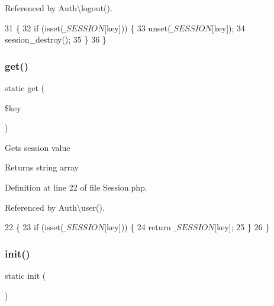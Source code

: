 Referenced by Auth\textbackslash{}logout().


\begin{DoxyCode}
31                                          \{
32         \textcolor{keywordflow}{if} (isset($\_SESSION[$key])) \{
33             unset($\_SESSION[$key]);
34             session\_destroy();
35         \}
36     \}
\end{DoxyCode}
\hypertarget{class_session_a15e2679f2a8f6fa4d60757f4d65413ac}{}\label{class_session_a15e2679f2a8f6fa4d60757f4d65413ac} 
\subsubsection{\texorpdfstring{get()}{get()}}
{\footnotesize\ttfamily static get (\begin{DoxyParamCaption}\item[{}]{\$key }\end{DoxyParamCaption})\hspace{0.3cm}{\ttfamily [static]}}

Gets session value

\begin{DoxyReturn}{Returns}
string array 
\end{DoxyReturn}


Definition at line 22 of file Session.\+php.



Referenced by Auth\textbackslash{}user().


\begin{DoxyCode}
22                                      \{
23         \textcolor{keywordflow}{if} (isset($\_SESSION[$key])) \{
24             \textcolor{keywordflow}{return} $\_SESSION[$key];
25         \}
26     \}
\end{DoxyCode}
\hypertarget{class_session_a9f0be6ae273d3669e11c29910a0be338}{}\label{class_session_a9f0be6ae273d3669e11c29910a0be338} 
\subsubsection{\texorpdfstring{init()}{init()}}
{\footnotesize\ttfamily static init (\begin{DoxyParamCaption}{ }\end{DoxyParamCaption})\hspace{0.3cm}{\ttfamily [static]}}

